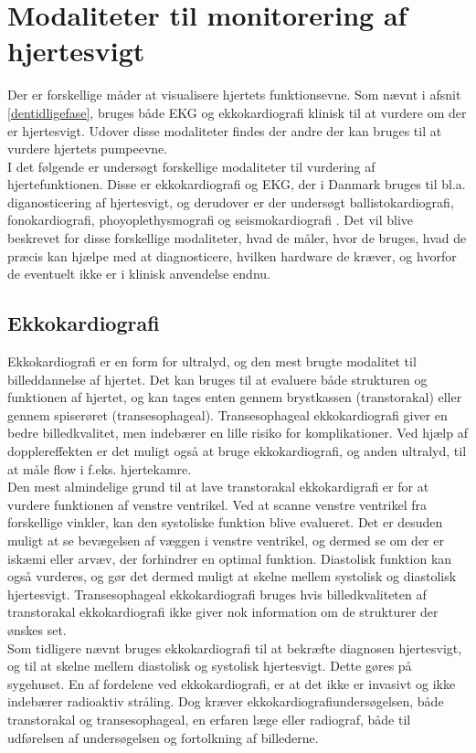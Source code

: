 \section{Modaliteter til monitorering af hjertesvigt}
Der er forskellige måder at visualisere hjertets funktionsevne. Som nævnt i afsnit \ref{dentidligefase}, bruges både EKG og ekkokardiografi klinisk til at vurdere om der er hjertesvigt. Udover disse modaliteter findes der andre der kan bruges til at vurdere hjertets pumpeevne.\\
I det følgende er undersøgt forskellige modaliteter til vurdering af hjertefunktionen. Disse er ekkokardiografi og EKG, der i Danmark bruges til bl.a. diganosticering af hjertesvigt, og derudover er der undersøgt ballistokardiografi, fonokardiografi, phoyoplethysmografi og seismokardiografi \citep{DCS} \citep{heartfailure} \citep{inan2015} \citep{jain2014}.
Det vil blive beskrevet for disse forskellige modaliteter, hvad de måler, hvor de bruges, hvad de præcis kan hjælpe med at diagnosticere, hvilken hardware de kræver, og hvorfor de eventuelt ikke er i klinisk anvendelse endnu.

\subsection{Ekkokardiografi}
Ekkokardiografi er en form for ultralyd, og den mest brugte modalitet til billeddannelse af hjertet. Det kan bruges til at evaluere både strukturen og funktionen af hjertet, og kan tages enten gennem brystkassen (transtorakal) eller gennem spiserøret (transesophageal). Transesophageal ekkokardiografi giver en bedre billedkvalitet, men indebærer en lille risiko for komplikationer. Ved hjælp af dopplereffekten er det muligt også at bruge ekkokardiografi, og anden ultralyd, til at måle flow i f.eks. hjertekamre. \citep{Matthias2014}\\
Den mest almindelige grund til at lave transtorakal ekkokardigrafi er for at vurdere funktionen af venstre ventrikel. Ved at scanne venstre ventrikel fra forskellige vinkler, kan den systoliske funktion blive evalueret. Det er desuden muligt at se bevægelsen af væggen i venstre ventrikel, og dermed se om der er iskæmi eller arvæv, der forhindrer en optimal funktion. Diastolisk funktion kan også vurderes, og gør det dermed muligt at skelne mellem systolisk og diastolisk hjertesvigt. Transesophageal ekkokardiografi bruges hvis billedkvaliteten af transtorakal ekkokardiografi ikke giver nok information om de strukturer der ønskes set. \citep{Matthias2014}\\
Som tidligere nævnt bruges ekkokardiografi til at bekræfte diagnosen hjertesvigt, og til at skelne mellem diastolisk og systolisk hjertesvigt. Dette gøres på sygehuset. En af fordelene ved ekkokardiografi, er at det ikke er invasivt og ikke indebærer radioaktiv stråling. Dog kræver
ekkokardiografiundersøgelsen, både transtorakal og transesophageal, en erfaren læge eller radiograf, både til udførelsen af undersøgelsen og fortolkning af billederne. \citep{Matthias2014}

